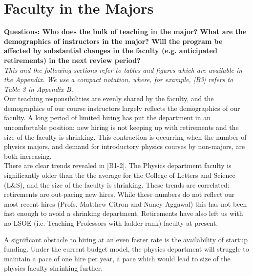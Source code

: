 \documentclass[12pt]{article}
\begin{document}
\newpage
\section{Faculty in the Majors}
\label{sec:faculty}

{\bf Questions: Who does the bulk of teaching in the major? What are
  the demographics of instructors in the major? Will the program be
  affected by substantial changes in the faculty (e.g. anticipated
  retirements) in the next review period?}\\[3pt]

\noindent
{\it This and the following sections refer to tables and figures which are available in the
  Appendix.  We use a compact notation, where, for example, [B3]
  refers to Table 3 in Appendix B.}\\[3pt]  

\noindent
Our teaching responsibilities are evenly shared by the faculty, and
the demographics of our course instructors largely reflects the
demographics of our faculty.  A long period of limited hiring has put
the department in an uncomfortable position: new hiring is not keeping
up with retirements and the size of the faculty is shrinking.  This
contraction is occurring when the number of physics majors, and demand
for introductory physics courses by non-majors, are both
increasing.\\[3pt]

 There are clear trends
revealed in [B1-2].  The Physics department faculty is significantly
older than the the average for the College of Letters and Science
(L\&S), and the size of the faculty is shrinking.  These trends are
correlated: retirements are out-pacing new hires.  While these numbers
do not reflect our most recent hires (Profs. Matthew Citron and Nancy
Aggawal) this has not been fast enough to avoid a shrinking
department.  Retirements have also left us with no LSOE (i.e. Teaching
Professors with ladder-rank) faculty at present.

A significant obstacle to hiring at an even faster rate is the
availability of startup funding.  Under the current budget model, the
physics department will struggle to maintain a pace of one hire per
year, a pace which would lead to size of the physics faculty shrinking
further.\\[3pt]
\end{document}

